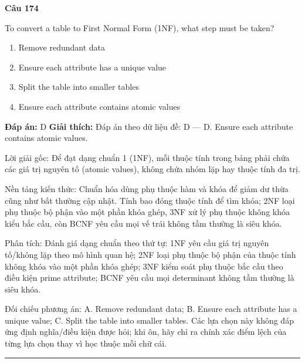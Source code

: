 \documentclass[11pt,a4paper]{article}
\newenvironment{question}[1]{%
  \par\vspace{1em}\noindent\textbf{\large Câu #1}\par\vspace{0.4em}
}{%
  \par\vspace{1em}\hrule\vspace{0.6em}
}
\newenvironment{choices}{%
  \begin{enumerate}[label=\textbf{\Alph*.},leftmargin=2.2em,itemsep=2pt,topsep=3pt]
}{%
  \end{enumerate}
}
\newcommand{\choice}{\item}
\begin{document}
\begin{question}{174}
To convert a table to First Normal Form (1NF), what step must be taken?
\begin{choices}
\choice Remove redundant data
\choice Ensure each attribute has a unique value
\choice Split the table into smaller tables
\choice Ensure each attribute contains atomic values
\end{choices}
\textbf{Đáp án:} D
\textbf{Giải thích:} Đáp án theo dữ liệu đề: D — D. Ensure each attribute contains atomic values.

Lời giải gốc: Để đạt dạng chuẩn 1 (1NF), mỗi thuộc tính trong bảng phải chứa các giá trị nguyên tố (atomic values), không chứa nhóm lặp hay thuộc tính đa trị.

Nền tảng kiến thức: Chuẩn hóa dùng phụ thuộc hàm và khóa để giảm dư thừa cũng như bất thường cập nhật. Tính bao đóng thuộc tính để tìm khóa; 2NF loại phụ thuộc bộ phận vào một phần khóa ghép, 3NF xử lý phụ thuộc không khóa kiểu bắc cầu, còn BCNF yêu cầu mọi vế trái không tầm thường là siêu khóa.

Phân tích: Đánh giá dạng chuẩn theo thứ tự: 1NF yêu cầu giá trị nguyên tố/không lặp theo mô hình quan hệ; 2NF loại phụ thuộc bộ phận của thuộc tính không khóa vào một phần khóa ghép; 3NF kiểm soát phụ thuộc bắc cầu theo điều kiện prime attribute; BCNF yêu cầu mọi determinant không tầm thường là siêu khóa.

Đối chiếu phương án: A. Remove redundant data; B. Ensure each attribute has a unique value; C. Split the table into smaller tables. Các lựa chọn này không đáp ứng định nghĩa/điều kiện được hỏi; khi ôn, hãy chỉ ra chính xác điểm lệch của từng lựa chọn thay vì học thuộc mỗi chữ cái.
\end{question}
\end{document}
